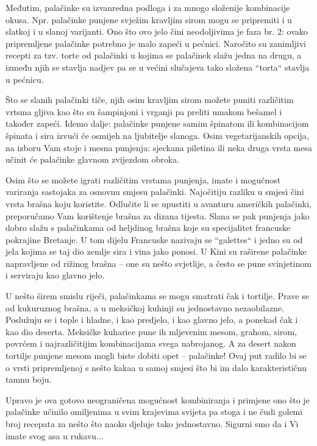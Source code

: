 \documentclass[11pt,twocolumn,english]{article}
\begin{document}
Međutim, palačinke su izvanredna podloga i za mnogo složenije kombinacije okusa.
Npr. palačinke punjene svježim kravljim sirom mogu se pripremiti i u slatkoj i u
slanoj varijanti. Ono što ovo jelo čini neodoljivima je faza br. 2: ovako
pripremljene palačinke potrebno je malo zapeći u pećnici. Naročito su zanimljivi
recepti za tzv. torte od palačinki u kojima se palačinek slažu jedna na drugu, a
između njih se stavlja nadjev pa se u većini slučajeva tako složena “torta“
stavlja u pećnicu.

Što se slanih palačinki tiče, njih osim kravljim sirom možete puniti različitim
vrtsma gljiva kao što su šampinjoni i vrganji pa preliti umakom bešamel i također
zapeći. Idemo dalje:  palačinke punjene samim špinatom ili kombinacijom špinata i
sira izvući će osmijeh na ljubitelje slanoga. Osim vegetarijanskih opcija, na
izboru Vam stoje i mesna punjenja: sjeckana piletina ili neka druga vrsta mesa
učinit će palačinke glavnom zvijezdom obroka.

Osim što se možete igrati različitim vrstama punjenja, imate i mogućnost
variranja sastojaka za osnovnu smjesu palačinki. Najočitiju razliku u smjesi čini
vrsta brašna koju koristite. Odlučite li se upustiti u avanturu američkih
palačinki, preporučamo Vam korištenje brašna za dizana tijesta. Slana se pak
punjenja jako dobro slažu s palačinkama od heljdinog brašna koje su specijalitet
francuske pokrajine Bretanje. U tom dijelu Francuske nazivaju se “galettes“ i
jedno su od jela kojima se taj dio zemlje sira i vina jako ponosi. U Kini su
raširene palačinke napravljene od rižinog brašna – one su nešto svjetlije, a
često se pune svinjetinom i serviraju kao glavno jelo.

U nešto širem smislu riječi, palačinkama se mogu smatrati čak i tortilje. Prave
se od kukuruznog brašna, a u meksičkoj kuhinji su jednostavno nezaobilazne.
Poslužuju se i tople i hladne, i kao predjelo, i kao glavno jelo, a ponekad čak i
kao dio deserta. Meksičke kuharice pune ih mljevenim mesom, grahom, sirom,
povrćem i najrazličitijim kombinacijama svega nabrojanog. A za desert nakon
tortilje punjene mesom mogli biste dobiti opet – palačinke! Ovaj put radilo bi se
o vrsti pripremljenoj s nešto kakaa u samoj smjesi što bi im dalo karakterističnu
tamnu boju.

Upravo je ova gotovo neograničena mogućnost kombiniranja i primjene ono što je
palačinke učinilo omiljenima u svim krajevima svijeta pa stoga i ne čudi golemi
broj recepata za nešto što naoko djeluje tako jednostavno. Sigurni smo da i Vi
imate svog asa u rukavu...

\nocite{Banko01mitigatingthe}
\nocite{ivankovic2009lcs}
\nocite{CoCoTehnickaDok}
\nocite{DBLP:series/sci/2007-43}
\nocite{Finn01factor}
\nocite{panian05informatickirjecnik}



\end{document}
